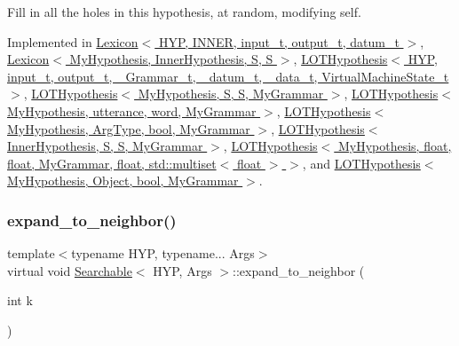 Fill in all the holes in this hypothesis, at random, modifying self. 



Implemented in \hyperlink{class_lexicon_a724ccdaffe9090488bfaa786873fa807}{Lexicon$<$ H\+Y\+P, I\+N\+N\+E\+R, input\+\_\+t, output\+\_\+t, datum\+\_\+t $>$}, \hyperlink{class_lexicon_a724ccdaffe9090488bfaa786873fa807}{Lexicon$<$ My\+Hypothesis, Inner\+Hypothesis, S, S $>$}, \hyperlink{class_l_o_t_hypothesis_a7f913b702b434003f94a84c560d16bf9}{L\+O\+T\+Hypothesis$<$ H\+Y\+P, input\+\_\+t, output\+\_\+t, \+\_\+\+Grammar\+\_\+t, \+\_\+datum\+\_\+t, \+\_\+data\+\_\+t, Virtual\+Machine\+State\+\_\+t $>$}, \hyperlink{class_l_o_t_hypothesis_a7f913b702b434003f94a84c560d16bf9}{L\+O\+T\+Hypothesis$<$ My\+Hypothesis, S, S, My\+Grammar $>$}, \hyperlink{class_l_o_t_hypothesis_a7f913b702b434003f94a84c560d16bf9}{L\+O\+T\+Hypothesis$<$ My\+Hypothesis, utterance, word, My\+Grammar $>$}, \hyperlink{class_l_o_t_hypothesis_a7f913b702b434003f94a84c560d16bf9}{L\+O\+T\+Hypothesis$<$ My\+Hypothesis, Arg\+Type, bool, My\+Grammar $>$}, \hyperlink{class_l_o_t_hypothesis_a7f913b702b434003f94a84c560d16bf9}{L\+O\+T\+Hypothesis$<$ Inner\+Hypothesis, S, S, My\+Grammar $>$}, \hyperlink{class_l_o_t_hypothesis_a7f913b702b434003f94a84c560d16bf9}{L\+O\+T\+Hypothesis$<$ My\+Hypothesis, float, float, My\+Grammar, float, std\+::multiset$<$ float $>$ $>$}, and \hyperlink{class_l_o_t_hypothesis_a7f913b702b434003f94a84c560d16bf9}{L\+O\+T\+Hypothesis$<$ My\+Hypothesis, Object, bool, My\+Grammar $>$}.

\mbox{\label{class_searchable_a1786307b9f2dadc8c66c94adef220270}} 
\subsubsection{\texorpdfstring{expand\+\_\+to\+\_\+neighbor()}{expand\_to\_neighbor()}}
{\footnotesize\ttfamily template$<$typename H\+YP, typename... Args$>$ \\
virtual void \hyperlink{class_searchable}{Searchable}$<$ H\+YP, Args $>$\+::expand\+\_\+to\+\_\+neighbor (\begin{DoxyParamCaption}\item[{int}]{k }\end{DoxyParamCaption})\hspace{0.3cm}{\ttfamily [pure virtual]}}



